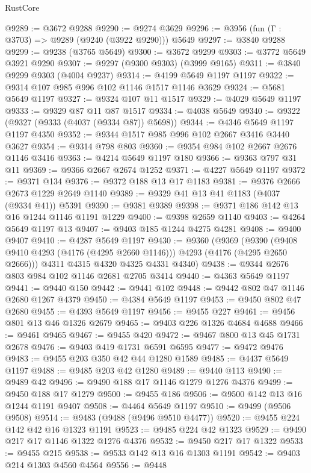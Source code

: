 \begin{lexlean}{RustCore}
\begin{coremodule}
@9289 := @3672 @9288
@9290 := @9274 @3629
@9296 := @3956 (fun (Γ : @3703) => @9289 (@9240 (@3922 @9290))) @5649
@9297 := @3840 @9288
@9299 := @9238 (@3765 @5649)
@9300 := @3672 @9299
@9303 := @3772 @5649 @3921 @9290
@9307 := @9297 (@9300 @9303) (@3999 @9165)
@9311 := @3840 @9299 @9303 (@4004 @9237)
@9314 := @4199 @5649 @1197 @1197
@9322 := @9314 @107 @985 @996 @102 @1146 @1517 @1146 @3629
@9324 := @5681 @5649 @1197
@9327 := @9324 @107 @11 @1517
@9329 := @4029 @5649 @1197
@9333 := @9329 @87 @11 @87 @1517
@9334 := @4038 @5649
@9340 := @9322 (@9327 (@9333 (@4037 (@9334 @87)) @5698))
@9344 := @4346 @5649 @1197 @1197 @4350
@9352 := @9344 @1517 @985 @996 @102 @2667 @3416 @3440 @3627
@9354 := @9314 @798 @803
@9360 := @9354 @984 @102 @2667 @2676 @1146 @3416
@9363 := @4214 @5649 @1197 @180
@9366 := @9363 @797 @31 @11
@9369 := @9366 @2667 @2674 @1252
@9371 := @4227 @5649 @1197
@9372 := @9371 @134
@9376 := @9372 @188 @13 @17 @1183
@9381 := @9376 @2666 @2673 @1229 @2649 @1140
@9389 := @9329 @41 @13 @41 @1183 (@4037 (@9334 @41)) @5391
@9390 := @9381 @9389
@9398 := @9371 @186 @142 @13 @16 @1244 @1146 @1191 @1229
@9400 := @9398 @2659 @1140
@9403 := @4264 @5649 @1197 @13
@9407 := @9403 @185 @1244 @4275 @4281
@9408 := @9400 @9407
@9410 := @4287 @5649 @1197
@9430 := @9360
    (@9369
      (@9390 (@9408 @9410 @4293 (@4176 (@4295 @2660 @1146))) @4293 (@4176 (@4295 @2650 @2666)))
      @4311
      @4315
      @4320
      @4325
      @4331
      @4340)
@9438 := @9344 @2676 @803 @984 @102 @1146 @2681 @2705 @3414
@9440 := @4363 @5649 @1197
@9441 := @9440 @150
@9442 := @9441 @102
@9448 := @9442 @802 @47 @1146 @2680 @1267 @4379
@9450 := @4384 @5649 @1197
@9453 := @9450 @802 @47 @2680
@9455 := @4393 @5649 @1197
@9456 := @9455 @227
@9461 := @9456 @801 @13 @46 @1326 @2679
@9465 := @9403 @226 @1326 @4684 @4688
@9466 := @9461 @9465
@9467 := @9455 @420
@9472 := @9467 @800 @13 @45 @1731 @2678
@9476 := @9403 @419 @1731 @6591 @6595
@9477 := @9472 @9476
@9483 := @9455 @203 @350 @42 @44 @1280 @1589
@9485 := @4437 @5649 @1197
@9488 := @9485 @203 @42 @1280
@9489 := @9440 @113
@9490 := @9489 @42
@9496 := @9490 @188 @17 @1146 @1279 @1276 @4376
@9499 := @9450 @188 @17 @1279
@9500 := @9455 @186
@9506 := @9500 @142 @13 @16 @1244 @1191 @9407
@9508 := @4464 @5649 @1197
@9510 := @9499 (@9506 @9508)
@9514 := @9483 (@9488 (@9496 @9510 @4477))
@9520 := @9455 @224 @142 @42 @16 @1323 @1191
@9523 := @9485 @224 @42 @1323
@9529 := @9490 @217 @17 @1146 @1322 @1276 @4376
@9532 := @9450 @217 @17 @1322
@9533 := @9455 @215
@9538 := @9533 @142 @13 @16 @1303 @1191
@9542 := @9403 @214 @1303 @4560 @4564
@9556 := @9448

\end{coremodule}
\end{lexlean}
